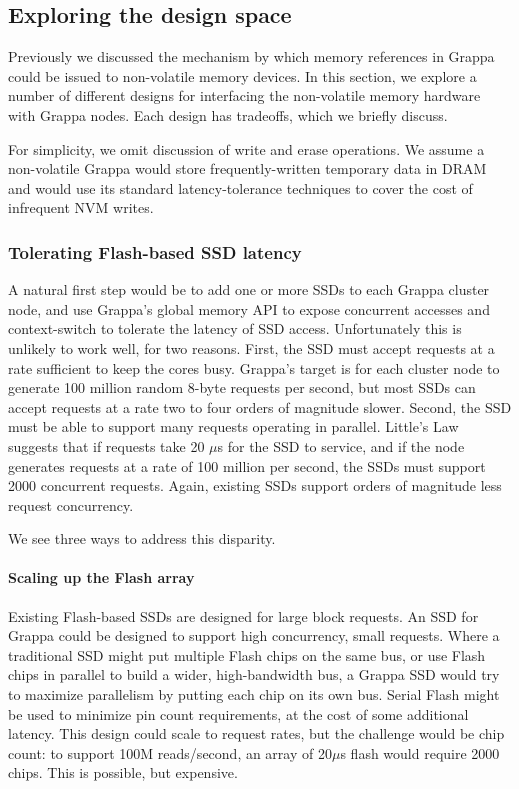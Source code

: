 \subsection{Exploring the design space}

Previously we discussed the mechanism by which memory references in
Grappa could be issued to non-volatile memory devices. In this
section, we explore a number of different designs for interfacing the
non-volatile memory hardware with Grappa nodes. Each design has
tradeoffs, which we briefly discuss.

For simplicity, we omit discussion of write and erase operations. We
assume a non-volatile Grappa would store frequently-written temporary
data in DRAM and would use its standard latency-tolerance techniques
to cover the cost of infrequent NVM writes.

\subsubsection{Tolerating Flash-based SSD latency} 
A natural first step would be to add one or more SSDs to each Grappa
cluster node, and use Grappa's global memory API to expose concurrent
accesses and context-switch to tolerate the latency of SSD
access. Unfortunately this is unlikely to work well, for two
reasons. First, the SSD must accept requests at a rate sufficient to
keep the cores busy. Grappa's target is for each cluster node to
generate 100 million random 8-byte requests per second, but most SSDs
can accept requests at a rate two to four orders of magnitude slower.
Second, the SSD must be able to support many requests operating in
parallel. Little's Law suggests that if requests take 20 $\mu$s for
the SSD to service, and if the node generates requests at a rate of
100 million per second, the SSDs must support 2000 concurrent
requests. Again, existing SSDs support orders of magnitude less request concurrency.

We see three ways to address this disparity.
\paragraph{Scaling up the Flash array}
Existing Flash-based SSDs are designed for large block requests. An
SSD for Grappa could be designed to support high concurrency, small
requests. Where a traditional SSD might put multiple Flash chips on
the same bus, or use Flash chips in parallel to build a wider,
high-bandwidth bus, a Grappa SSD would try to maximize parallelism by
putting each chip on its own bus. Serial Flash might be used to
minimize pin count requirements, at the cost of some additional
latency. This design could scale to request rates, but the challenge
would be chip count: to support 100M reads/second, an array of
20$\mu$s flash would require 2000 chips. This is possible, but expensive.

